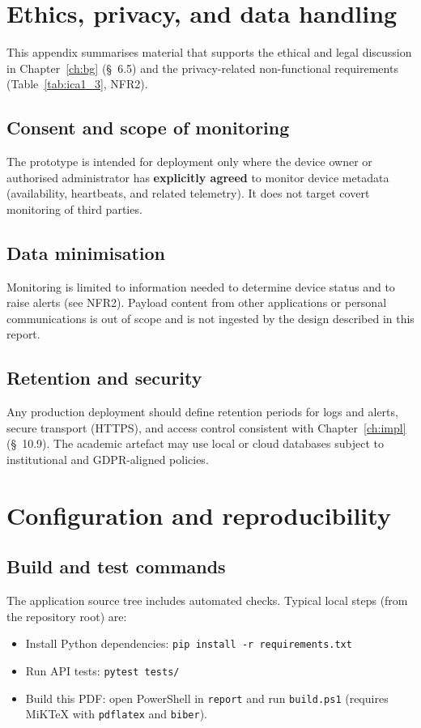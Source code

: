 \chapter{Ethics, privacy, and data handling}
\label{app:ethics}

This appendix summarises material that supports the ethical and legal discussion in Chapter~\ref{ch:bg} (\S~6.5) and the privacy-related non-functional requirements (Table~\ref{tab:ica1_3}, NFR2).

\section{Consent and scope of monitoring}
The prototype is intended for deployment only where the device owner or authorised administrator has \textbf{explicitly agreed} to monitor device metadata (availability, heartbeats, and related telemetry). It does not target covert monitoring of third parties.

\section{Data minimisation}
Monitoring is limited to information needed to determine device status and to raise alerts (see NFR2). Payload content from other applications or personal communications is out of scope and is not ingested by the design described in this report.

\section{Retention and security}
Any production deployment should define retention periods for logs and alerts, secure transport (HTTPS), and access control consistent with Chapter~\ref{ch:impl} (\S~10.9). The academic artefact may use local or cloud databases subject to institutional and GDPR-aligned policies.

\chapter{Configuration and reproducibility}
\label{app:config}

\section{Build and test commands}
The application source tree includes automated checks. Typical local steps (from the repository root) are:
\begin{itemize}
  \item Install Python dependencies: \texttt{pip install -r requirements.txt}
  \item Run API tests: \texttt{pytest tests/}
  \item Build this PDF: open PowerShell in \texttt{report} and run \texttt{build.ps1} (requires MiKTeX with \texttt{pdflatex} and \texttt{biber}).
\end{itemize}

